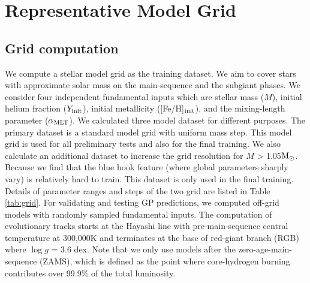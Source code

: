 \section{Representative Model Grid}\label{sec:grid}

\subsection{Grid computation}

We compute a stellar model grid as the training dataset. We aim to cover stars with approximate solar mass on the main-sequence and the subgiant phases. We consider four independent fundamental inputs which are stellar mass ($M$), initial helium fraction ($Y_{\rm init}$), initial metallicity ([Fe/H]$_{\rm init}$), and the mixing-length parameter ($\alpha_{\rm MLT}$). 
%
We calculated three model dataset for different purposes. The primary dataset is a standard model grid with uniform mass step. This model grid is used for all preliminary tests and also for the final training. 
%
We also calculate an additional dataset to increase the grid resolution for $M$ > 1.05$\rm M_{\odot}$. Because we find that the blue hook feature (where global parameters sharply vary) is relatively hard to train. This dataset is only used in the final training. 
Details of parameter ranges and steps of the two grid are listed in Table \ref{tab:grid}. 
%
For validating and testing GP predictions, we computed off-grid models with randomly sampled fundamental inputs. 
%
%
The computation of evolutionary tracks starts at the Hayashi line with pre-main-sequence central temperature at 300,000K and terminates at the base of red-giant branch (RGB) where $\log g$ = 3.6 dex. Note that we only use models after the zero-age-main-sequence (ZAMS), which is defined as the point where core-hydrogen burning contributes over 99.9\% of the total luminosity. 
%

